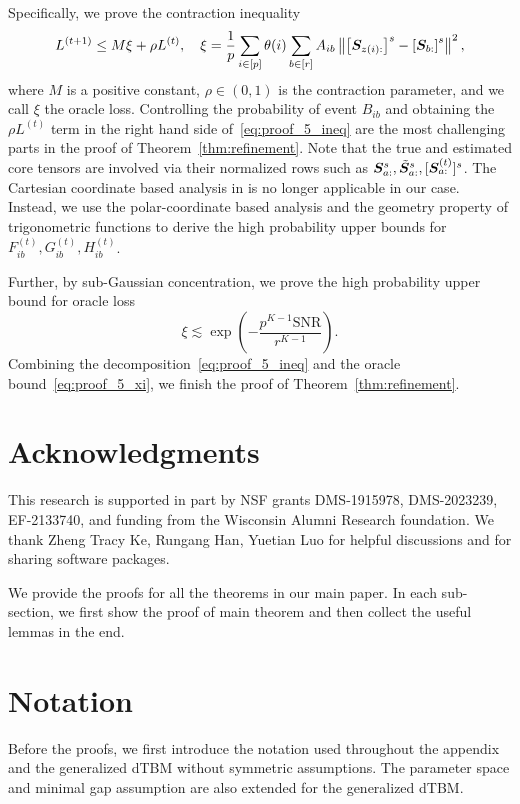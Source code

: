 \documentclass[lettersize,onecolumn,journal]{IEEEtran}
\theoremstyle{definition}
\theoremstyle{definition}
\newcommand{\of}[1]{\left(#1\right)}
\newcommand{\off}[1]{\left[#1\right]}
\begin{document}
Specifically, we prove the contraction inequality
\begin{equation}\label{eq:proof_5_ineq}
    L^{(t+1)} \leq M \xi + \rho L^{(t)}, \quad \xi = \frac{1}{p}  \sum_{i \in [p]} \theta(i) \sum_{b \in [r]}  A_{ib} \onorm{ \off{ \mS_{ z(i):}  }^s - \off{ \mS_{b:}  }^s  }^2,
\end{equation}
where $M$ is a positive constant, $\rho \in (0,1)$ is the contraction parameter, and we call $\xi$ the oracle loss. Controlling the probability of event $B_{ib}$ and obtaining the $\rho L^{(t)}$ term in the right hand side of~\eqref{eq:proof_5_ineq} are the most challenging parts in the proof of Theorem~\ref{thm:refinement}. Note that the true and estimated core tensors are involved via their normalized rows such as $\bm S_{a:}^s, \tilde {\bm S}_{a:}^s, [\bm S^{(t)}_{a:}]^s$. The Cartesian coordinate based analysis in \cite{han2020exact} is no longer applicable in our case. Instead, we use the polar-coordinate based analysis and the geometry property of trigonometric functions to derive the high probability upper bounds for $F_{ib}^{(t)}, G_{ib}^{(t)}, H_{ib}^{(t)}$. 

Further, by sub-Gaussian concentration, we prove the high probability upper bound for oracle loss
\begin{equation}\label{eq:proof_5_xi}
    \xi  \lesssim \exp\of{- \frac{p^{K-1}\text{SNR}}{r^{K-1}}}.
\end{equation}
Combining the decomposition~\eqref{eq:proof_5_ineq} and the oracle bound~\eqref{eq:proof_5_xi}, we finish the proof of Theorem~\ref{thm:refinement}.


\section*{Acknowledgments}
This research is supported in part by NSF grants DMS-1915978, DMS-2023239, EF-2133740, and funding from the Wisconsin Alumni Research foundation. We thank Zheng Tracy Ke, Rungang Han, Yuetian Luo for helpful discussions and for sharing software packages. 






\newpage
\appendix


We provide the proofs for all the theorems in our main paper. In each sub-section, we first show the proof of main theorem and then collect the useful lemmas in the end.

\section*{Notation}
Before the proofs, we first introduce the notation used throughout the appendix and the generalized dTBM without symmetric assumptions. The parameter space and minimal gap assumption are also extended for the generalized dTBM. 
\end{document}
